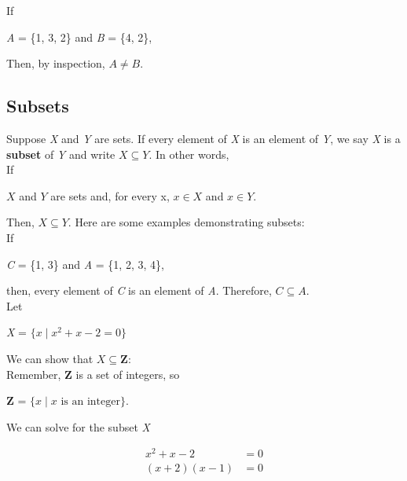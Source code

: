 If

\begin{center}
\textit{A} = \{1, 3, 2\} and \textit{B} = \{4, 2\},
\end{center}

Then, by inspection, $A \neq B$.
\clearpage

\subsection*{Subsets}

Suppose \textit{X} and \textit{Y} are sets.  If every element of \textit{X} is an element of \textit{Y}, we say \textit{X} is a \textbf{subset} of \textit{Y} and write $X \subseteq Y$.  In other words,\\

If

\begin{center}
$X$ and $Y$ are sets and, for every x, $x \in X$ and $x \in Y$.
\end{center}

Then, $X \subseteq Y$.  Here are some examples demonstrating subsets:\\

If

\begin{center}
\textit{C} = \{1, 3\} and \textit{A} = \{1, 2, 3, 4\},
\end{center}

then, every element of \textit{C} is an element of \textit{A}.  Therefore, $C \subseteq A$.\\

Let

\begin{center}
\textit{X} = $\{x \mid x^2 + x - 2 = 0 \}$
\end{center}

We can show that $X \subseteq \textbf{Z}$:\\

Remember, \textbf{Z} is a set of integers, so

\begin{center}
    \textbf{Z} = $\{x \mid x \text{ is an integer}\}$.
\end{center}

We can solve for the subset \textit{X}

\begin{align*}
x^2 + x - 2 &= 0\\
(x+2)(x-1) &= 0
\end{align*}

